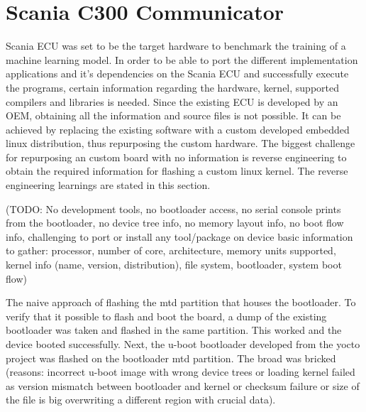 \chapter{Scania C300 Communicator} \label{rtc-c300}
Scania ECU was set to be the target hardware to benchmark the training of a machine learning model. In order to be able to port the different implementation applications and it's dependencies on the Scania ECU and successfully execute the programs, certain information regarding the hardware, kernel, supported compilers and libraries is needed. Since the existing ECU is developed by an OEM, obtaining all the information and source files is not possible.
It can be achieved by replacing the existing software with a custom developed embedded linux distribution, thus repurposing the custom hardware.
The biggest challenge for repurposing an custom board with no information is reverse engineering to obtain the required information for flashing a custom linux kernel. The reverse engineering learnings are stated in this section.


(TODO: No development tools, no bootloader access, no serial console prints from the bootloader, no device tree info, no memory layout info, no boot flow info, challenging to port or install any tool/package on device
basic information to gather: processor, number of core, architecture, memory units supported, kernel info (name, version, distribution), file system, bootloader, system boot flow)




The naive approach of flashing the mtd partition that houses the bootloader. To verify that it possible to flash and boot the board, a dump of the existing bootloader was taken and flashed in the same partition. This worked and the device booted successfully. Next, the u-boot bootloader developed from the yocto project was flashed on the bootloader mtd partition. The broad was bricked (reasons: incorrect u-boot image with wrong device trees or loading kernel failed as version mismatch between bootloader and kernel or checksum failure or size of the file is big overwriting a different region with crucial data).

